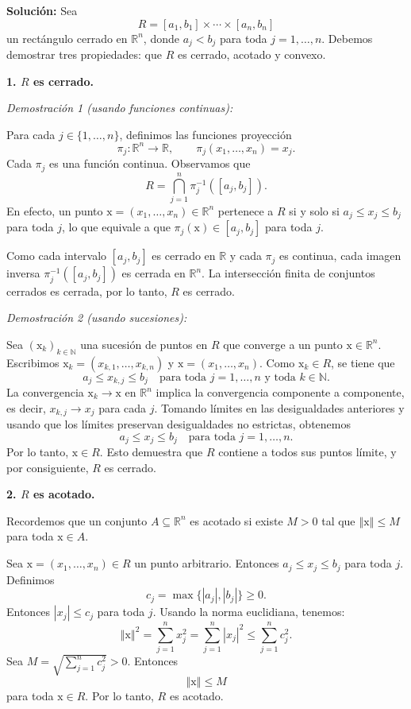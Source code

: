 \documentclass[12pt]{article}
\newcommand{\abs}[1]{\left\vert#1\right\vert}
\newcommand{\norm}[1]{\left\Vert#1\right\Vert}
\newcommand{\N}{\mathbb N}
\newcommand{\R}{\mathbb R}
\newcommand{\x}{\mathrm x}
\begin{document}
\begin{enumerate}
\textbf{Solución: } Sea
\[
R = [a_1,b_1]\times \cdots\times [a_n,b_n]
\]
un rectángulo cerrado en $\R^n$, donde $a_j < b_j$ para toda $j = 1, \ldots, n$. Debemos demostrar tres propiedades: que $R$ es cerrado, acotado y convexo.

\textbf{1. $R$ es cerrado.}

\textit{Demostración 1 (usando funciones continuas):}

Para cada $j \in \{1, \ldots, n\}$, definimos las funciones proyección
\[
\pi_j : \R^n \to \R, \qquad \pi_j(x_1, \ldots, x_n) = x_j.
\]
Cada $\pi_j$ es una función continua. Observamos que
\[
R = \bigcap_{j=1}^{n} \pi_j^{-1}([a_j, b_j]).
\]
En efecto, un punto $\x = (x_1, \ldots, x_n) \in \R^n$ pertenece a $R$ si y solo si $a_j \leq x_j \leq b_j$ para toda $j$, lo que equivale a que $\pi_j(\x) \in [a_j, b_j]$ para toda $j$.

Como cada intervalo $[a_j, b_j]$ es cerrado en $\R$ y cada $\pi_j$ es continua, cada imagen inversa $\pi_j^{-1}([a_j, b_j])$ es cerrada en $\R^n$. La intersección finita de conjuntos cerrados es cerrada, por lo tanto, $R$ es cerrado.

\textit{Demostración 2 (usando sucesiones):}

Sea $(\x_k)_{k \in \N}$ una sucesión de puntos en $R$ que converge a un punto $\x \in \R^n$. Escribimos $\x_k = (x_{k,1}, \ldots, x_{k,n})$ y $\x = (x_1, \ldots, x_n)$. Como $\x_k \in R$, se tiene que
\[
a_j \leq x_{k,j} \leq b_j \quad \text{para toda } j = 1, \ldots, n \text{ y toda } k \in \N.
\]
La convergencia $\x_k \to \x$ en $\R^n$ implica la convergencia componente a componente, es decir, $x_{k,j} \to x_j$ para cada $j$. Tomando límites en las desigualdades anteriores y usando que los límites preservan desigualdades no estrictas, obtenemos
\[
a_j \leq x_j \leq b_j \quad \text{para toda } j = 1, \ldots, n.
\]
Por lo tanto, $\x \in R$. Esto demuestra que $R$ contiene a todos sus puntos límite, y por consiguiente, $R$ es cerrado.

\textbf{2. $R$ es acotado.}

Recordemos que un conjunto $A \subseteq \R^n$ es acotado si existe $M > 0$ tal que $\norm{\x} \leq M$ para toda $\x \in A$.

Sea $\x = (x_1, \ldots, x_n) \in R$ un punto arbitrario. Entonces $a_j \leq x_j \leq b_j$ para toda $j$. Definimos
\[
c_j = \max\{\abs{a_j}, \abs{b_j}\} \geq 0.
\]
Entonces $\abs{x_j} \leq c_j$ para toda $j$. Usando la norma euclidiana, tenemos:
\[
\norm{\x}^2 = \sum_{j=1}^{n} x_j^2 = \sum_{j=1}^{n} \abs{x_j}^2 \leq \sum_{j=1}^{n} c_j^2.
\]
Sea $M = \sqrt{\sum_{j=1}^{n} c_j^2} > 0$. Entonces
\[
\norm{\x} \leq M
\]
para toda $\x \in R$. Por lo tanto, $R$ es acotado.


\end{enumerate}
\end{document}
